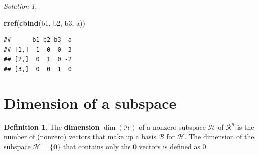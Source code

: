 \documentclass[
]{book}
\newenvironment{Shaded}{\begin{snugshade}}{\end{snugshade}}
\newcommand{\KeywordTok}[1]{\textcolor[rgb]{0.13,0.29,0.53}{\textbf{#1}}}
\newcommand{\NormalTok}[1]{#1}
\theoremstyle{definition}
\newtheorem{definition}{Definition}[chapter]
\theoremstyle{definition}
\theoremstyle{definition}
\theoremstyle{definition}
\theoremstyle{remark}
\newtheorem*{solution}{Solution}
\begin{document}
\begin{solution}
\begin{Shaded}
\begin{Highlighting}[]
\KeywordTok{rref}\NormalTok{(}\KeywordTok{cbind}\NormalTok{(b1, b2, b3, a))}
\end{Highlighting}
\end{Shaded}

\begin{verbatim}
##      b1 b2 b3  a
## [1,]  1  0  0  3
## [2,]  0  1  0 -2
## [3,]  0  0  1  0
\end{verbatim}

\end{solution}

\hypertarget{dimension-of-a-subspace}{%
\section{Dimension of a subspace}\label{dimension-of-a-subspace}}

\begin{definition}
\protect\hypertarget{def:dimension}{}\label{def:dimension}The \textbf{dimension} \(\operatorname{dim}(\mathcal{H})\) of a nonzero subspace \(\mathcal{H}\) of \(\mathcal{R}^n\) is the number of (nonzero) vectors that make up a basis \(\mathcal{B}\) for \(\mathcal{H}\). The dimension of the subspace \(\mathcal{H} = \{\mathbf{0}\}\) that contains only the \(\mathbf{0}\) vectors is defined as 0.
\end{definition}
\end{document}
